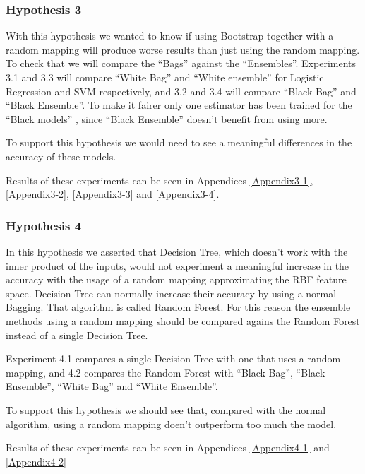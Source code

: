   \begin{pre-delivery}
  \subsubsection*{Hypothesis 3}

  With this hypothesis we wanted to know if using Bootstrap together with a
  random mapping will produce worse results than just using the random
  mapping. To check that we will compare the ``Bags'' against the ``Ensembles''.
  Experiments 3.1 and 3.3 will compare ``White Bag'' and ``White ensemble'' for
  Logistic Regression and SVM respectively, and 3.2 and 3.4 will compare
  ``Black Bag'' and ``Black Ensemble''. To make it fairer only one estimator
  has been trained for the ``Black models'' , since ``Black Ensemble''
  doesn't benefit from using more.

  To support
  this hypothesis we would need to see a meaningful
  differences in the accuracy of these models.

  Results of these experiments can be seen in Appendices
  \ref{Appendix3-1},
  \ref{Appendix3-2},
  \ref{Appendix3-3} and
  \ref{Appendix3-4}.



  \subsubsection*{Hypothesis 4}

  In this hypothesis we asserted that Decision Tree, which doesn't work with
  the inner product of the inputs, would not experiment a meaningful increase
  in the accuracy with the usage of a random mapping approximating the
  RBF feature space. Decision Tree can normally increase their accuracy
  by using a normal Bagging. That algorithm is called Random Forest. For this
  reason the ensemble methods using a random mapping should be compared agains
  the Random Forest instead of a single Decision Tree.

  Experiment 4.1 compares a single Decision Tree with one that uses a
  random mapping, and 4.2 compares the Random Forest with
  ``Black Bag'',
  ``Black Ensemble'',
  ``White Bag'' and
  ``White Ensemble''.


  To support this hypothesis we should see that, compared with the normal
  algorithm, using a random mapping doen't outperform too much the model.

  Results of these experiments can be seen in Appendices \ref{Appendix4-1}
  and \ref{Appendix4-2}
\end{pre-delivery}
